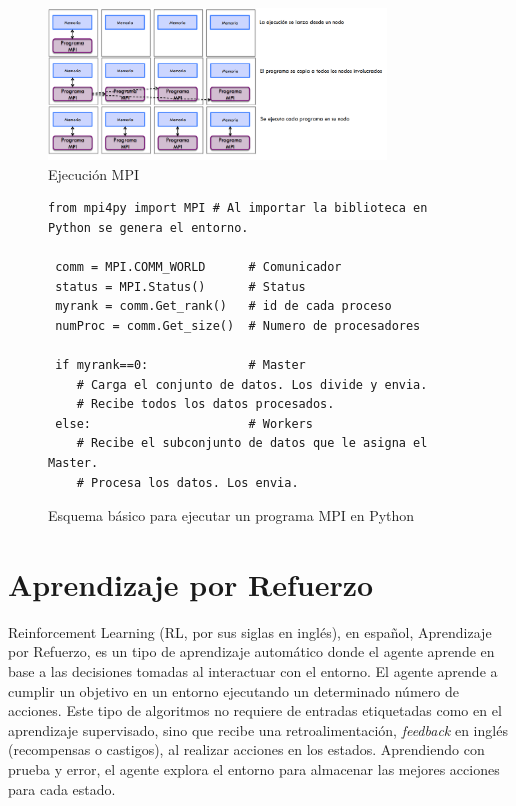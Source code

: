 	\begin{figure}[!h]
		\centering
		\includegraphics[width=0.80\textwidth]{images/chapter_2/mpi_2}
		\caption{Ejecución MPI}
		\label{fig:ejecucion_mpi}
	\end{figure}
	
	\vspace{-0.2cm}
	
	\vspace{-0.1cm}

	\begin{figure}[!h]
		
		\begin{lstlisting}[frame=single]
 from mpi4py import MPI # Al importar la biblioteca en Python se genera el entorno.

 comm = MPI.COMM_WORLD     	# Comunicador
 status = MPI.Status()   	# Status
 myrank = comm.Get_rank() 	# id de cada proceso
 numProc = comm.Get_size() 	# Numero de procesadores

 if myrank==0:           	# Master
    # Carga el conjunto de datos. Los divide y envia.
    # Recibe todos los datos procesados.
 else:                   	# Workers
    # Recibe el subconjunto de datos que le asigna el Master.
    # Procesa los datos. Los envia.
		\end{lstlisting}
		\caption{Esquema básico para ejecutar un programa MPI en Python}
		\label{fig:esquema_mpi}
	\end{figure}
	
	\newpage

\section{Aprendizaje por Refuerzo}
\label{cap:2_2}
	Reinforcement Learning (RL, por sus siglas en inglés), en español, Aprendizaje por Refuerzo, es un tipo de aprendizaje automático donde el agente aprende en base a las decisiones tomadas al interactuar con el entorno. El agente aprende a cumplir un objetivo en un entorno ejecutando un determinado número de acciones. Este tipo de algoritmos no requiere de entradas etiquetadas como en el aprendizaje supervisado, sino que recibe una retroalimentación, \textit{feedback} en inglés (recompensas o castigos), al realizar acciones en los estados. Aprendiendo con prueba y error, el agente explora el entorno para almacenar las mejores acciones para cada estado. 

